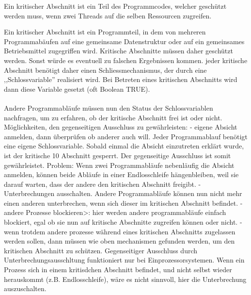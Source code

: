 \begin{answer}
Ein kritischer Abschnitt ist ein Teil des Programmcodes, welcher geschützt werden muss, wenn zwei Threads auf die selben Ressourcen zugreifen.

Ein kritischer Abschnitt ist ein Programmteil, in dem von mehreren Programmabäufen auf eine gemeinsame
Datenstruktur oder auf ein gemeinsames Betriebsmittel zugegriffen wird. Kritische Abschnitte müssen daher geschützt werden. Sonst würde es eventuell zu falschen Ergebnissen kommen. jeder kritische Abschnitt benötigt daher einen Schliessmechanismus, der durch eine ,,Schlossvariable'' realisiert wird. Bei Betreten eines kritischen Abschnitts wird dann diese Variable gesetzt (oft Boolean TRUE).

\paragraph*{}
Andere Programmabläufe müssen nun den Status der Schlossvariablen nachfragen,
um zu erfahren, ob der kritische Abschnitt frei ist oder nicht.
Möglichkeiten, den gegenseitigen Ausschluss zu gewährleisten:
- eigene Absicht anmelden, dann überprüfen ob anderer auch will. Jeder Programmablauf benötigt
eine eigene Schlossvariable. Sobald einmal die Absicht einzutreten erklärt wurde, ist der kritische
10
Abschnitt gesperrt. Der gegenseitige Ausschluss ist somit gewährleistet.
Problem: Wenn zwei Programmabläufe nebenläufig die Absicht anmelden, können beide Abläufe
in einer Endlosschleife hängenbleiben, weil sie darauf warten, dass der andere den kritischen Abschnitt
freigibt.
- Unterbrechungen ausschalten. Andere Programmabläufe können nun nicht mehr einen anderen
unterbrechen, wenn sich dieser im kritischen Abschnitt befindet.
- andere Prozesse blockieren>: hier werden andere programmabläufe einfach blockiert, egal ob sie
nun auf kritische Abschnitte zugreifen können oder nicht.
- wenn trotdem andere prozesse während eines kritischen Abschnitts zugelassen werden sollen,
dann müssen wie oben mechanismen gefunden werden, um den kritischen Abschnitt zu schützen.
Gegenseitiger Ausschluss durch Unterbrechungsausschltung funktioniert nur bei Einprozessorsystemen.
Wenn ein Prozess sich in einem kritisdchen Abschnitt befindet, und nicht selbst wieder
herauskommt (z.B. Endlosschleife), wäre es nicht sinnvoll, hier die Unterbrechung auszuschalten.
\end{answer}


